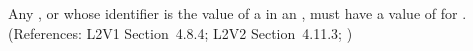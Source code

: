 Any \Compartment, \Species or \Parameter whose identifier is the value of a
  in an \AssignmentRule, must have a value of
 for .  (References: L2V1 Section~4.8.4; L2V2
Section~4.11.3; )
